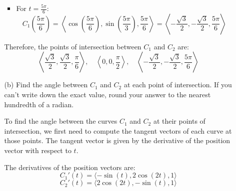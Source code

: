 \documentclass[reqno, 12pt]{amsart}
\begin{document}
\begin{itemize}
\begin{itemize}
\begin{answerbox}
\begin{itemize}
\[              \]
            \item For \( t = \frac{5\pi}{6} \):
              \[
                C_1\left(\frac{5\pi}{6}\right) = \left\langle\cos\left(\frac{5\pi}{6}\right), \sin\left(\frac{5\pi}{3}\right), \frac{5\pi}{6}\right\rangle = \left\langle-\frac{\sqrt{3}}{2}, -\frac{\sqrt{3}}{2}, \frac{5\pi}{6}\right\rangle
              \]
          \end{itemize}
          Therefore, the points of intersection between \( C_1 \) and \( C_2 \) are:
          \[
            \left\langle\frac{\sqrt{3}}{2}, \frac{\sqrt{3}}{2}, \frac{\pi}{6}\right\rangle, \quad \left\langle 0, 0, \frac{\pi}{2}\right\rangle, \quad \left\langle-\frac{\sqrt{3}}{2}, -\frac{\sqrt{3}}{2}, \frac{5\pi}{6}\right\rangle
          \]


        \end{answerbox}
        \vspace{0.5 in}
      \item[(b)] Find the angle between $C_1$ and $C_2$ at each point of intersection. If you can't write down the exact value, round your answer to the nearest hundredth of a radian.
        \newline

        \begin{answerbox}
          To find the angle between the curves \( C_1 \) and \( C_2 \) at their points of intersection, we first need to compute the tangent vectors of each curve at those points. The tangent vector is given by the derivative of the position vector with respect to \( t \).

          The derivatives of the position vectors are:
          \[
            C_1'(t) = \langle -\sin(t), 2\cos(2t), 1 \rangle
          \]
          \[
            C_2'(t) = \langle 2\cos(2t), -\sin(t), 1 \rangle
          \]


\end{answerbox}
\end{itemize}
\end{itemize}
\end{document}

